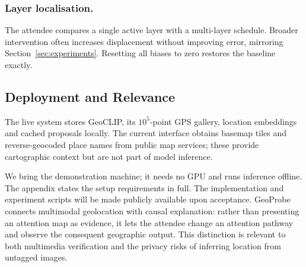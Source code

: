 \subsubsection{Layer localisation.}
The attendee compares a single active layer with a multi-layer schedule.
Broader intervention often increases displacement without improving error,
mirroring Section~\ref{sec:experiments}. Resetting all biases to zero restores
the baseline exactly.

\subsection{Deployment and Relevance}

The live system stores GeoCLIP, its $10^5$-point GPS gallery, location
embeddings and cached proposals locally. The current interface obtains
basemap tiles and reverse-geocoded place names from public map services;
these provide cartographic context but are not part of model inference.

We bring the demonstration machine; it needs no GPU and runs inference
offline. The appendix states the setup requirements in full. The implementation and
experiment scripts will be made publicly available upon acceptance.
GeoProbe connects multimodal geolocation with causal explanation: rather than
presenting an attention map as evidence, it lets the attendee change an
attention pathway and observe the consequent geographic output. This
distinction is relevant to both multimedia verification and the privacy risks
of inferring location from untagged images.
